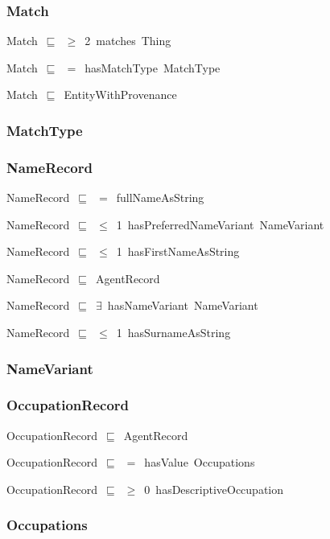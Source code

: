 \documentclass{article}
\begin{document}
\subsubsection*{Match}

Match~\ensuremath{\sqsubseteq}~\ensuremath{\geq}~2~matches~Thing~

Match~\ensuremath{\sqsubseteq}~\ensuremath{=}~hasMatchType~MatchType~

Match~\ensuremath{\sqsubseteq}~EntityWithProvenance~

\subsubsection*{MatchType}

\subsubsection*{NameRecord}

NameRecord~\ensuremath{\sqsubseteq}~\ensuremath{=}~fullNameAsString~

NameRecord~\ensuremath{\sqsubseteq}~\ensuremath{\leq}~1~hasPreferredNameVariant~NameVariant~

NameRecord~\ensuremath{\sqsubseteq}~\ensuremath{\leq}~1~hasFirstNameAsString~

NameRecord~\ensuremath{\sqsubseteq}~AgentRecord~

NameRecord~\ensuremath{\sqsubseteq}~\ensuremath{\exists}~hasNameVariant~NameVariant~

NameRecord~\ensuremath{\sqsubseteq}~\ensuremath{\leq}~1~hasSurnameAsString~

\subsubsection*{NameVariant}

\subsubsection*{OccupationRecord}

OccupationRecord~\ensuremath{\sqsubseteq}~AgentRecord~

OccupationRecord~\ensuremath{\sqsubseteq}~\ensuremath{=}~hasValue~Occupations~

OccupationRecord~\ensuremath{\sqsubseteq}~\ensuremath{\geq}~0~hasDescriptiveOccupation~

\subsubsection*{Occupations}
\end{document}
